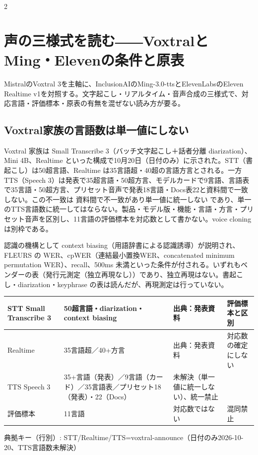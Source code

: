 \documentclass[lualatex,a4paper,10pt]{jlreq}
\begin{document}
\begin{multicols}{2} %


\section{声の三様式を読む――VoxtralとMing・Elevenの条件と原表}
\label{sec:P5}


MistralのVoxtral 3を主軸に、InclusionAIのMing-3.0-ttsとElevenLabsのEleven Realtime v1を対照する。文字起こし・リアルタイム・音声合成の三様式で、対応言語・評価標本・原表の有無を混ぜない読み方が要る。


\subsection*{Voxtral家族の言語数は単一値にしない}


Voxtral 家族は Small Transcribe 3（バッチ文字起こし＋話者分離 diarization）、Mini 4B、Realtime といった構成で10月20日（日付のみ）に示された。STT（書起こし）は50超言語、Realtime は35言語超・40超の言語方言とされる。一方 TTS（Speech 3）は発表で35超言語・50超方言、モデルカードで9言語、言語表で35言語・50超方言、プリセット音声で発表18言語・Docs表22と資料間で一致しない。この不一致は 資料間で不一致があり単一値に統一しない であり、単一のTTS言語数に統一してはならない。製品・モデル版・機能・言語・方言・プリセット音声を区別し、11言語の評価標本を対応数として書かない。voice cloning は別枠である。


認識の機構として context biasing（用語辞書による認識誘導）が説明され、FLEURS の WER、cpWER（連結最小置換WER、concatenated minimum permutation WER）、recall、500ms 未満といった条件が付される。いずれもベンダーの表（発行元測定（独立再現なし））であり、独立再現はない。書起こし・diarization・keyphrase の表は読んだが、再現測定は行っていない。


\end{multicols} %
{\centering\footnotesize
{}
\begin{tabularx}{0.96\linewidth}{@{}lXXX@{}}
\toprule
STT Small Transcribe 3 & 50超言語・diarization・context biasing & 出典：発表資料 & 評価標本と区別 \\
\midrule
Realtime & 35言語超／40+方言 & 出典：発表資料 & 対応数の確定にしない \\
TTS Speech 3 & 35+言語（発表）／9言語（カード）／35言語表／プリセット18（発表）・22（Docs） & 未解決（単一値に統一しない）、統一禁止 &  \\
評価標本 & 11言語 & 対応数ではない & 混同禁止 \\
\bottomrule
\end{tabularx}
{\scriptsize\color{SurveyMuted} 典拠キー（行別）: STT/Realtime/TTS=voxtral-announce（日付のみ2026-10-20、TTS言語数未解決）\par}
} %
\end{document}
